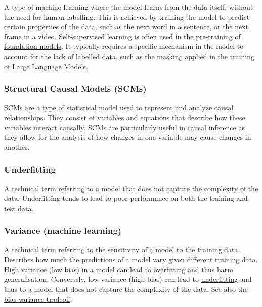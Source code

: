 A type of machine learning where the model learns from the data itself, without the need for human labelling.
This is achieved by training the model to predict certain properties of the data, such as the next word in a sentence, or the next frame in a video.
Self-supervised learning is often used in the pre-training of \protect\hyperlink{foundation-model}{foundation models}.
It typically requires a specific mechanism in the model to account for the lack of labelled data, such as the masking applied in the training of \protect\hyperlink{large-language-models}{Large Language Models}.

\hypertarget{structural-causal-models-scms}{%
\subsubsection{Structural Causal Models (SCMs)}\label{structural-causal-models-scms}}

SCMs are a type of statistical model used to represent and analyze causal relationships.
They consist of variables and equations that describe how these variables interact causally.
SCMs are particularly useful in causal inference as they allow for the analysis of how changes in one variable may cause changes in another.

\hypertarget{underfitting}{%
\subsubsection{Underfitting}\label{underfitting}}

A technical term referring to a model that does not capture the complexity of the data.
Underfitting tends to lead to poor performance on both the training and test data.

\hypertarget{variance-machine-learning}{%
\subsubsection{Variance (machine learning)}\label{variance-machine-learning}}

A technical term referring to the sensitivity of a model to the training data.
Describes how much the predictions of a model vary given different training data.
High variance (low bias) in a model can lead to \protect\hyperlink{overfitting}{overfitting} and thus harm generalisation.
Conversely, low variance (high bias) can lead to \protect\hyperlink{underfitting}{underfitting} and thus to a model that does not capture the complexity of the data.
See also the \protect\hyperlink{bias-variance-tradeoff}{bias-variance tradeoff}.


